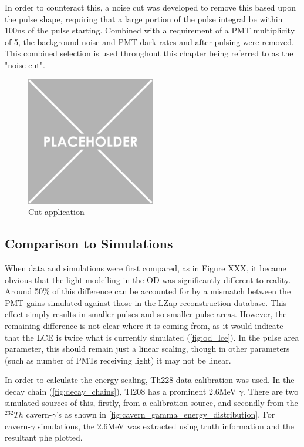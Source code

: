 \par
In order to counteract this, a noise cut was developed to remove this based upon the pulse shape, requiring that a large portion of the pulse integral be within 100ns of the pulse starting.
Combined with a requirement of a PMT multiplicity of 5, the background noise and PMT dark rates and after pulsing were removed.
This combined selection is used throughout this chapter being referred to as the "noise cut".

\begin{figure}
    \centering
    \includegraphics[width=0.5\textwidth]{Figures/Placeholder.png}
    \caption{Cut application}
    \label{fig:od_noise_cut}
\end{figure}

\subsection{Comparison to Simulations}
\par

When data and simulations were first compared, as in Figure XXX, it became obvious that the light modelling in the OD was significantly different to reality.
Around 50\% of this difference can be accounted for by a mismatch between the PMT gains simulated against those in the LZap reconstruction database.
This effect simply results in smaller pulses and so smaller pulse areas.
However, the remaining difference is not clear where it is coming from, as it would indicate that the LCE is twice what is currently simulated (\autoref{fig:od_lce}).
In the pulse area parameter, this should remain just a linear scaling, though in other parameters (such as number of PMTs receiving light) it may not be linear.

\par
In order to calculate the energy scaling, Th228 data calibration was used. 
In the decay chain (\autoref{fig:decay_chains}), Tl208 has a prominent 2.6MeV $\gamma$. 
There are two simulated sources of this, firstly, from a calibration source, and secondly from the ${}^{232}Th$ cavern-$\gamma$'s as shown in \autoref{fig:cavern_gamma_energy_distribution}.
For cavern-$\gamma$ simulations, the 2.6MeV was extracted using truth information and the resultant phe plotted.



